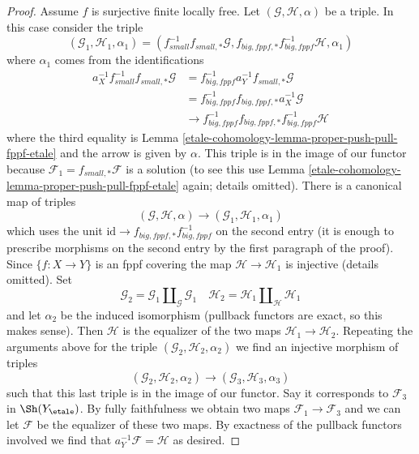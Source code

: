 \begin{proof}
\medskip\noindent
Assume $f$ is surjective finite locally free.
Let $(\mathcal{G}, \mathcal{H}, \alpha)$ be a triple.
In this case consider the triple
$$
(\mathcal{G}_1, \mathcal{H}_1, \alpha_1) =
(f_{small}^{-1}f_{small, *}\mathcal{G},
f_{big, fppf, *}f_{big, fppf}^{-1}\mathcal{H}, \alpha_1)
$$
where $\alpha_1$ comes from the identifications
\begin{align*}
a_X^{-1}f_{small}^{-1}f_{small, *}\mathcal{G}
& =
f_{big, fppf}^{-1}a_Y^{-1}f_{small, *}\mathcal{G} \\
& =
f_{big, fppf}^{-1}f_{big, fppf, *}a_X^{-1}\mathcal{G} \\
& \to
f_{big, fppf}^{-1}f_{big, fppf, *}f_{big, fppf}^{-1}\mathcal{H}
\end{align*}
where the third equality is Lemma \ref{etale-cohomology-lemma-proper-push-pull-fppf-etale}
and the arrow is given by $\alpha$.
This triple is in the image of our functor because
$\mathcal{F}_1 = f_{small, *}\mathcal{F}$ is a solution
(to see this use Lemma \ref{etale-cohomology-lemma-proper-push-pull-fppf-etale} again;
details omitted). There is a canonical map of triples
$$
(\mathcal{G}, \mathcal{H}, \alpha)
\to
(\mathcal{G}_1, \mathcal{H}_1, \alpha_1)
$$
which uses the unit $\text{id} \to f_{big, fppf, *}f_{big, fppf}^{-1}$
on the second entry (it is enough to prescribe morphisms on the
second entry by the first paragraph of the proof). Since
$\{f : X \to Y\}$ is an fppf covering the map
$\mathcal{H} \to \mathcal{H}_1$ is injective (details omitted).
Set
$$
\mathcal{G}_2 = \mathcal{G}_1 \amalg_\mathcal{G} \mathcal{G}_1\quad
\mathcal{H}_2 = \mathcal{H}_1 \amalg_\mathcal{H} \mathcal{H}_1
$$
and let $\alpha_2$ be the induced isomorphism (pullback functors
are exact, so this makes sense). Then $\mathcal{H}$ is the
equalizer of the two maps $\mathcal{H}_1 \to \mathcal{H}_2$.
Repeating the arguments above for the triple
$(\mathcal{G}_2, \mathcal{H}_2, \alpha_2)$
we find an injective morphism of triples
$$
(\mathcal{G}_2, \mathcal{H}_2, \alpha_2)
\to
(\mathcal{G}_3, \mathcal{H}_3, \alpha_3)
$$
such that this last triple is in the image of our functor.
Say it corresponds to $\mathcal{F}_3$ in $\Sh(Y_\etale)$.
By fully faithfulness we obtain two maps
$\mathcal{F}_1 \to \mathcal{F}_3$ and we can let
$\mathcal{F}$ be the equalizer of these two maps.
By exactness of the pullback functors involved we
find that $a_Y^{-1}\mathcal{F} = \mathcal{H}$ as desired.
\end{proof}

